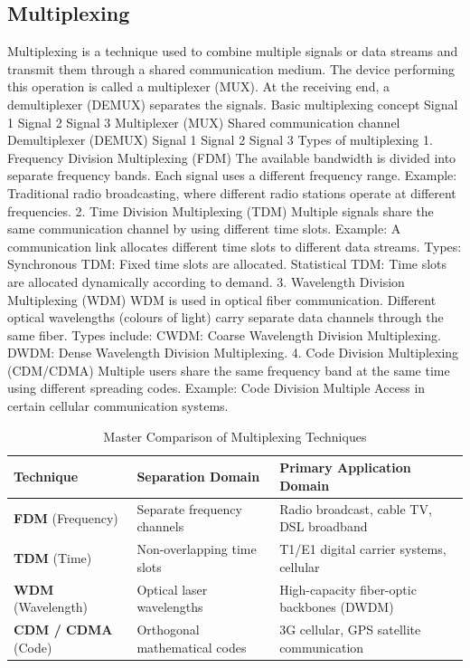 \subsection{Multiplexing}
Multiplexing is a technique used to combine multiple signals or data streams and transmit them through a shared communication medium.
The device performing this operation is called a multiplexer (MUX).
At the receiving end, a demultiplexer (DEMUX) separates the signals.
Basic multiplexing concept
Signal 1
Signal 2
Signal 3
Multiplexer (MUX)
Shared communication channel
Demultiplexer (DEMUX)
Signal 1
Signal 2
Signal 3
Types of multiplexing
1. Frequency Division Multiplexing (FDM)
The available bandwidth is divided into separate frequency bands.
Each signal uses a different frequency range.
Example: Traditional radio broadcasting, where different radio stations operate at different frequencies.
2. Time Division Multiplexing (TDM)
Multiple signals share the same communication channel by using different time slots.
Example: A communication link allocates different time slots to different data streams.
Types:
Synchronous TDM: Fixed time slots are allocated.
Statistical TDM: Time slots are allocated dynamically according to demand.
3. Wavelength Division Multiplexing (WDM)
WDM is used in optical fiber communication.
Different optical wavelengths (colours of light) carry separate data channels through the same fiber.
Types include:
CWDM: Coarse Wavelength Division Multiplexing.
DWDM: Dense Wavelength Division Multiplexing.
4. Code Division Multiplexing (CDM/CDMA)
Multiple users share the same frequency band at the same time using different spreading codes.
Example: Code Division Multiple Access in certain cellular communication systems.
\begin{table}[htbp]
\centering
\caption{Master Comparison of Multiplexing Techniques}
\label{tab:multiplexing_techniques}
\begin{tabularx}{\textwidth}{p{3.2cm} p{3.2cm} X}
\toprule
\textbf{Technique} & \textbf{Separation Domain} & \textbf{Primary Application Domain} \\
\midrule
\textbf{FDM} (Frequency) & Separate frequency channels & Radio broadcast, cable TV, DSL broadband \\
\textbf{TDM} (Time) & Non-overlapping time slots & T1/E1 digital carrier systems, cellular \\
\textbf{WDM} (Wavelength) & Optical laser wavelengths & High-capacity fiber-optic backbones (DWDM) \\
\textbf{CDM / CDMA} (Code) & Orthogonal mathematical codes & 3G cellular, GPS satellite communication \\
\bottomrule
\end{tabularx}
\end{table}
